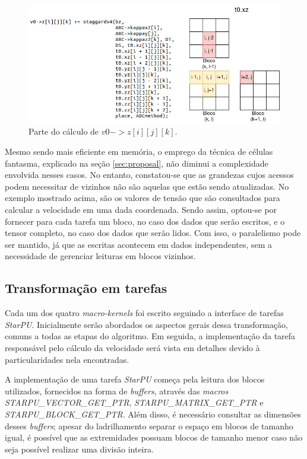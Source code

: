 \documentclass[cic,tc]{iiufrgs}
\begin{document}
\begin{figure}[!htb]
  \caption{Parte do cálculo de $v0->z[i][j][k]$.}
    \begin{center} 
      \includegraphics[width=32em]{neighborhood}
    \end{center}
    \label{fig:neighborhood}
\end{figure}

Mesmo sendo mais eficiente em memória, o emprego da técnica de células fantasma, explicado na seção \ref{sec:proposal}, não diminui
a complexidade envolvida nesses casos. No entanto, constatou-se que as grandezas cujos acessos podem necessitar de vizinhos não são
aquelas que estão sendo atualizadas. No exemplo mostrado acima, são os valores de tensão que são consultados para calcular a velocidade
em uma dada coordenada. Sendo assim, optou-se por fornecer para cada tarefa um bloco, no caso dos dados que serão escritos, e o tensor
completo, no caso dos dados que serão lidos. Com isso, o paralelismo pode ser mantido, já que as escritas acontecem em dados independentes,
sem a necessidade de gerenciar leituras em blocos vizinhos.

\subsection{Transformação em tarefas}\label{sec:task}

Cada um dos quatro \textit{macro-kernels} foi escrito seguindo a interface de tarefas \textit{StarPU}. Inicialmente serão abordados
os aspectos gerais dessa transformação, comuns a todas as etapas do algoritmo. Em seguida, a implementação da tarefa responsável
pelo cálculo da velocidade será vista em detalhes devido à particularidades nela encontradas.

A implementação de uma tarefa \textit{StarPU} começa pela leitura dos blocos utilizados, fornecidos na forma de \textit{buffers}, através 
das \textit{macros STARPU\_VECTOR\_GET\_PTR}, \textit{STARPU\_MATRIX\_GET\_PTR} e \textit{STARPU\_BLOCK\_GET\_PTR}. Além disso, é
necessário consultar as dimensões desses \textit{buffers}; apesar do ladrilhamento separar o espaço em blocos de tamanho igual, é possível
que as extremidades possuam blocos de tamanho menor caso não seja possível realizar uma divisão inteira.
\end{document}
